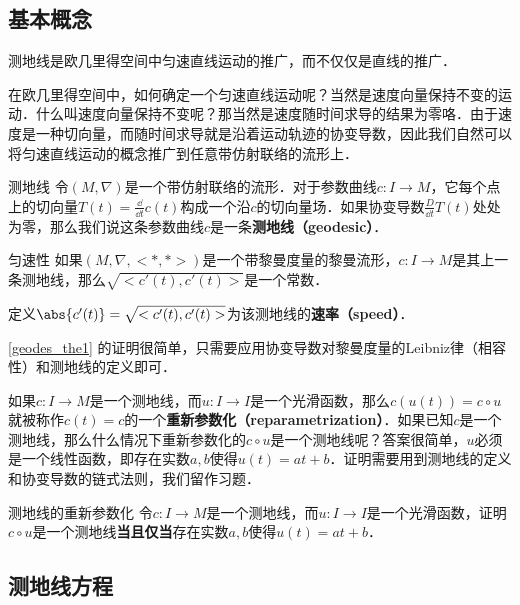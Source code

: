

\subsection{基本概念}

测地线是欧几里得空间中匀速直线运动的推广，而不仅仅是直线的推广．

在欧几里得空间中，如何确定一个匀速直线运动呢？当然是速度向量保持不变的运动．什么叫速度向量保持不变呢？那当然是速度随时间求导的结果为零咯．由于速度是一种切向量，而随时间求导就是沿着运动轨迹的协变导数，因此我们自然可以将匀速直线运动的概念推广到任意带仿射联络的流形上．

\begin{definition}{测地线}
令$(M, \nabla)$是一个带仿射联络的流形．对于参数曲线$c:I\to M$，它每个点上的切向量$T(t)=\frac{\dd}{\dd t}c(t)$构成一个沿$c$的切向量场．如果协变导数$\frac{D}{\dd t}T(t)$处处为零，那么我们说这条参数曲线$c$是一条\textbf{测地线（geodesic）}．
\end{definition}

\begin{theorem}{匀速性}\label{geodes_the1}
如果$(M, \nabla, <*, *>)$是一个带黎曼度量的黎曼流形，$c:I\to M$是其上一条测地线，那么$\sqrt{<c'(t), c'(t)>}$是一个常数．

定义$\abs{c'(t)}=\sqrt{<c'(t), c'(t)>}$为该测地线的\textbf{速率（speed）}．
\end{theorem}

\autoref{geodes_the1} 的证明很简单，只需要应用协变导数对黎曼度量的Leibniz律（相容性）和测地线的定义即可．



如果$c:I\to M$是一个测地线，而$u:I\to I$是一个光滑函数，那么$c(u(t))=c\circ u$就被称作$c(t)=c$的一个\textbf{重新参数化（reparametrization）}．如果已知$c$是一个测地线，那么什么情况下重新参数化的$c\circ u$是一个测地线呢？答案很简单，$u$必须是一个线性函数，即存在实数$a, b$使得$u(t)=at+b$．证明需要用到测地线的定义和协变导数的链式法则，我们留作习题．

\begin{exercise}{测地线的重新参数化}
令$c:I\to M$是一个测地线，而$u:I\to I$是一个光滑函数，证明$c\circ u$是一个测地线\textbf{当且仅当}存在实数$a, b$使得$u(t)=at+b$．
\end{exercise}

\subsection{测地线方程}

